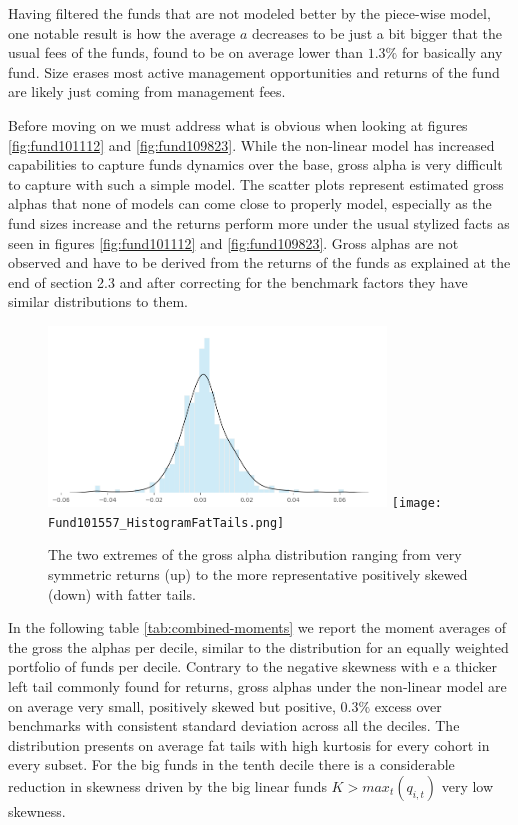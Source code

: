 \documentclass[12pt]{article}
\begin{document}
\par Having filtered the funds that are not modeled better by the piece-wise model, one notable result is how the average $a$ decreases to be just a bit bigger that the usual fees of the funds, found to be on average lower than $1.3\% $ for basically any fund. Size erases most active management opportunities and returns of the fund are likely just coming from management fees.

\par Before moving on we must address what is obvious when looking at figures \ref{fig:fund101112} and \ref{fig:fund109823}. While the non-linear model has increased capabilities to capture funds dynamics over the base, gross alpha is very difficult to capture with such a simple model. The scatter plots represent estimated gross alphas that none of models can come close to properly model, especially as the fund sizes increase and the returns perform more under the usual stylized facts as seen in figures \ref{fig:fund101112} and \ref{fig:fund109823}. Gross alphas are not observed and have to be derived from the returns of the funds as explained at the end of section 2.3 and after correcting for the benchmark factors they have similar distributions to them. 


\begin{figure}[H]
    \centering
    \includegraphics[width=0.80\textwidth]{HistogramFatTails101112.png}
    \texttt{[image: Fund101557\_HistogramFatTails.png]}
    \caption{The two extremes of the gross alpha distribution ranging from very symmetric returns (up) to the more representative positively skewed (down) with fatter tails.}
    \label{fig:fund101112_grossalpha}
\end{figure}

\par In the following table \ref{tab:combined-moments} we report the moment averages of the gross the alphas per decile, similar to the distribution for an equally weighted portfolio of funds per decile. Contrary to the negative skewness with e a thicker left tail commonly found for returns, gross alphas under the non-linear model are on average very small, positively skewed but positive, $0.3\%$ excess over benchmarks with consistent standard deviation across all the deciles. The distribution presents on average fat tails with high kurtosis for every cohort in every subset. For the big funds in the tenth decile there is a considerable reduction in skewness driven by the big linear funds $K>max_{t}(q_{i,t})$ very low skewness.
\end{document}
